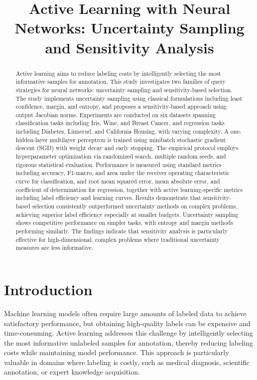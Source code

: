 \documentclass[conference]{IEEEtran}
\title{Active Learning with Neural Networks: Uncertainty Sampling and Sensitivity Analysis}
\author{\IEEEauthorblockN{\nameinit\ \surname\ \, (\studentnumber)}
\IEEEauthorblockA{Stellenbosch University\\ Machine Learning 441\\ \emailaddr}}
\begin{document}
\maketitle

\begin{abstract}
Active learning aims to reduce labeling costs by intelligently selecting the most informative samples for annotation. This study investigates two families of query strategies for neural networks: uncertainty sampling and sensitivity-based selection. The study implements uncertainty sampling using classical formulations including least confidence, margin, and entropy, and proposes a sensitivity-based approach using output Jacobian norms. Experiments are conducted on six datasets spanning classification tasks including Iris, Wine, and Breast Cancer, and regression tasks including Diabetes, Linnerud, and California Housing, with varying complexity. A one-hidden-layer multilayer perceptron is trained using minibatch stochastic gradient descent (SGD) with weight decay and early stopping. The empirical protocol employs hyperparameter optimization via randomized search, multiple random seeds, and rigorous statistical evaluation. Performance is measured using standard metrics including accuracy, F1-macro, and area under the receiver operating characteristic curve for classification, and root mean squared error, mean absolute error, and coefficient of determination for regression, together with active learning-specific metrics including label efficiency and learning curves. Results demonstrate that sensitivity-based selection consistently outperformed uncertainty methods on complex problems, achieving superior label efficiency especially at smaller budgets. Uncertainty sampling shows competitive performance on simpler tasks, with entropy and margin methods performing similarly. The findings indicate that sensitivity analysis is particularly effective for high-dimensional, complex problems where traditional uncertainty measures are less informative.
\end{abstract}

\section{Introduction}

Machine learning models often require large amounts of labeled data to achieve satisfactory performance, but obtaining high-quality labels can be expensive and time-consuming. Active learning addresses this challenge by intelligently selecting the most informative unlabeled samples for annotation, thereby reducing labeling costs while maintaining model performance. This approach is particularly valuable in domains where labeling is costly, such as medical diagnosis, scientific annotation, or expert knowledge acquisition.
\end{document}
